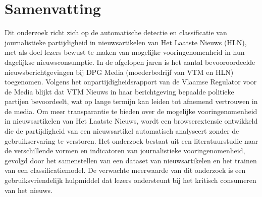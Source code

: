 \documentclass[dutch,dit,thesis]{hogentreport}
\begin{document}
\section*{Samenvatting}

Dit onderzoek richt zich op de automatische detectie en classificatie van journalistieke partijdigheid in nieuwsartikelen van Het Laatste Nieuws (HLN), met als doel lezers bewust te maken van mogelijke vooringenomenheid in hun dagelijkse nieuwsconsumptie. In de afgelopen jaren is het aantal bevooroordeelde nieuwsberichtgevingen bij DPG Media (moederbedrijf van VTM en HLN) toegenomen. Volgens het onpartijdigheidsrapport van de Vlaamse Regulator voor de Media blijkt dat VTM Nieuws in haar berichtgeving bepaalde politieke partijen bevoordeelt, wat op lange termijn kan leiden tot afnemend vertrouwen in de media. Om meer transparantie te bieden over de mogelijke vooringenomenheid in nieuwsartikelen van Het Laatste Nieuws, wordt een browserextensie ontwikkeld die de partijdigheid van een nieuwsartikel automatisch analyseert zonder de gebruikservaring te verstoren. Het onderzoek bestaat uit een literatuurstudie naar de verschillende vormen en indicatoren van journalistieke vooringenomenheid, gevolgd door het samenstellen van een dataset van nieuwsartikelen en het trainen van een classificatiemodel. De verwachte meerwaarde van dit onderzoek is een gebruiksvriendelijk hulpmiddel dat lezers ondersteunt bij het kritisch consumeren van het nieuws.



\backmatter{}

\setlength\bibitemsep{2pt}
\begin{sloppy}
    \sloppy
    \printbibliography[heading=bibintoc]
\end{sloppy}
\end{document}
